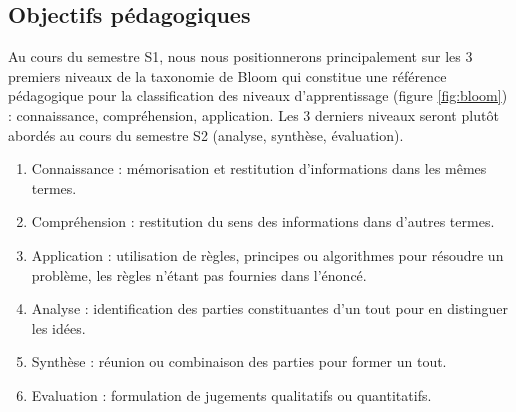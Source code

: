 \subsection{Objectifs pédagogiques}\label{sub:pedago}
\mbox{}
Au cours du semestre S1, nous nous positionnerons principalement sur les 3 premiers 
niveaux de la taxonomie de Bloom qui constitue une référence pédagogique pour la 
classification des 
niveaux d'apprentissage (figure \ref{fig:bloom}) : connaissance, compréhension, application. 
Les 3 derniers niveaux seront plutôt abordés au cours 
du semestre S2 (analyse, synthèse, évaluation).
\begin{enumerate}
\item Connaissance : mémorisation et restitution d'informations dans les mêmes termes.
\item Compréhension : restitution du sens des informations dans d'autres termes.
\item Application : utilisation de règles, principes ou algorithmes pour résoudre un problème, les règles 
	n'étant pas fournies dans l'énoncé.
\item Analyse : identification des parties constituantes d'un tout pour en distinguer les idées.
\item Synthèse : réunion ou combinaison des parties pour former un tout.
\item Evaluation : formulation de jugements qualitatifs ou quantitatifs.
\end{enumerate}

